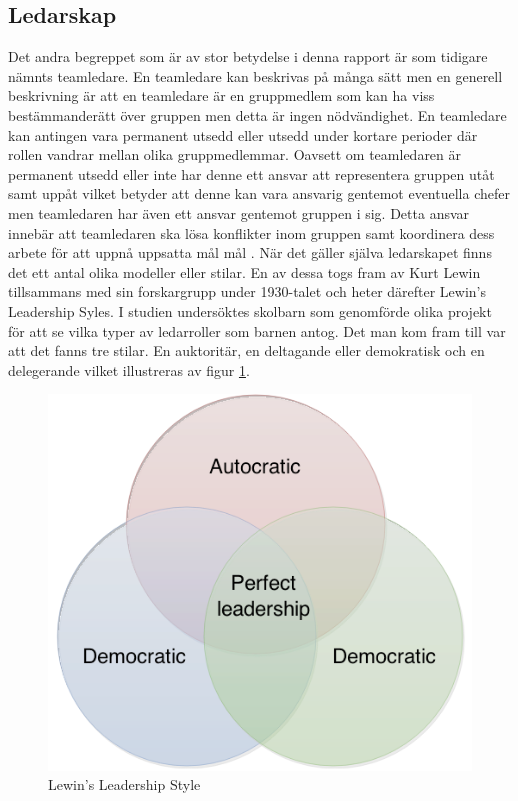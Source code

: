 \subsection{Ledarskap}
Det andra begreppet som är av stor betydelse i denna rapport är som tidigare nämnts teamledare. En teamledare kan beskrivas på många sätt men en generell beskrivning är att en teamledare är en gruppmedlem som kan ha viss bestämmanderätt över gruppen men detta är ingen nödvändighet. En teamledare kan antingen vara permanent utsedd eller utsedd under kortare perioder där rollen vandrar mellan olika gruppmedlemmar. Oavsett om teamledaren är permanent utsedd eller inte har denne ett ansvar att representera gruppen utåt samt uppåt vilket betyder att denne kan vara ansvarig gentemot eventuella chefer men teamledaren har även ett ansvar gentemot gruppen i sig. Detta ansvar innebär att teamledaren ska lösa konflikter inom gruppen samt koordinera dess arbete för att uppnå uppsatta mål mål \citep{BD}. 
\newline \newline
När det gäller själva ledarskapet finns det ett antal olika modeller eller stilar. En av dessa togs fram av Kurt Lewin tillsammans med sin forskargrupp under 1930-talet och heter därefter Lewin's Leadership Syles. I studien undersöktes skolbarn som genomförde olika projekt för att se vilka typer av ledarroller som barnen antog. Det man kom fram till var att det fanns tre stilar. En auktoritär, en deltagande eller demokratisk och en delegerande \citep{KAC} vilket illustreras av figur \ref{fig:Lewin}. 
\begin{figure}[H]
\centerline{\includegraphics[scale=0.6]{adam-tex/graphic/kurt}}
\caption{Lewin's Leadership Style}
\label{fig:Lewin}
\end{figure}
